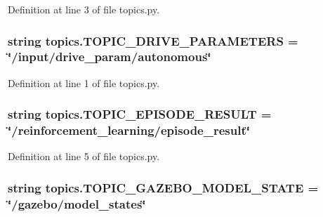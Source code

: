 Definition at line 3 of file topics.\+py.

\subsubsection[{\texorpdfstring{T\+O\+P\+I\+C\+\_\+\+D\+R\+I\+V\+E\+\_\+\+P\+A\+R\+A\+M\+E\+T\+E\+RS}{TOPIC_DRIVE_PARAMETERS}}]{\setlength{\rightskip}{0pt plus 5cm}string topics.\+T\+O\+P\+I\+C\+\_\+\+D\+R\+I\+V\+E\+\_\+\+P\+A\+R\+A\+M\+E\+T\+E\+RS = \char`\"{}/input/drive\+\_\+param/autonomous\char`\"{}}\hypertarget{namespacetopics_aa8a3d8ee1bd4559d446bceb3f6c97344}{}\label{namespacetopics_aa8a3d8ee1bd4559d446bceb3f6c97344}


Definition at line 1 of file topics.\+py.

\subsubsection[{\texorpdfstring{T\+O\+P\+I\+C\+\_\+\+E\+P\+I\+S\+O\+D\+E\+\_\+\+R\+E\+S\+U\+LT}{TOPIC_EPISODE_RESULT}}]{\setlength{\rightskip}{0pt plus 5cm}string topics.\+T\+O\+P\+I\+C\+\_\+\+E\+P\+I\+S\+O\+D\+E\+\_\+\+R\+E\+S\+U\+LT = \char`\"{}/reinforcement\+\_\+learning/episode\+\_\+result\char`\"{}}\hypertarget{namespacetopics_a16a444b7aadcb1fc5a83c7092978dd7e}{}\label{namespacetopics_a16a444b7aadcb1fc5a83c7092978dd7e}


Definition at line 5 of file topics.\+py.

\subsubsection[{\texorpdfstring{T\+O\+P\+I\+C\+\_\+\+G\+A\+Z\+E\+B\+O\+\_\+\+M\+O\+D\+E\+L\+\_\+\+S\+T\+A\+TE}{TOPIC_GAZEBO_MODEL_STATE}}]{\setlength{\rightskip}{0pt plus 5cm}string topics.\+T\+O\+P\+I\+C\+\_\+\+G\+A\+Z\+E\+B\+O\+\_\+\+M\+O\+D\+E\+L\+\_\+\+S\+T\+A\+TE = \char`\"{}/gazebo/model\+\_\+states\char`\"{}}\hypertarget{namespacetopics_a776b6454a1d4d1538991cbca9540aab6}{}\label{namespacetopics_a776b6454a1d4d1538991cbca9540aab6}


